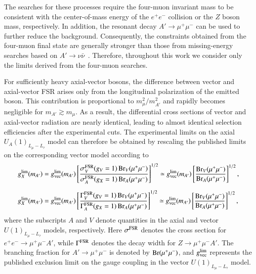 \documentclass[onecolumn, aps, nofootinbib, prd, preprint, floats, floatfix, amsmath, amssymb, superscriptaddress, preprintnumbers]{revtex4-2}
\begin{document}
The searches for these processes require the four-muon invariant mass to be consistent with the center-of-mass energy of the $e^+e^-$ collision or the $Z$ boson mass, respectively. In addition, the resonant decay $A'\to\mu^+\mu^-$ can be used to further reduce the background. Consequently, the constraints obtained from the four-muon final state are generally stronger than those from missing-energy searches based on $A'\rightarrow\nu\bar{\nu}$~\cite{Belle-II:2022yaw}. Therefore, throughout this work we consider only the limits derived from the four-muon searches.

For sufficiently heavy axial-vector bosons, the difference between vector and axial-vector FSR arises only from the longitudinal polarization of the emitted boson. This contribution is proportional to $m_\mu^2/m_{A'}^2$ and rapidly becomes negligible for $m_{A'}\gtrsim m_\mu$. As a result, the differential cross sections of vector and axial-vector radiation are nearly identical, leading to almost identical selection efficiencies after the experimental cuts. The experimental limits on the axial $U_A(1)_{L_\mu-L_\tau}$ model can therefore be obtained by rescaling the published limits on the corresponding vector model according to
\begin{equation}
	\begin{aligned}
		g_X^{\rm lim}(m_{A'})
		&=
		g_{\rm vec}^{\rm lim}(m_{A'})
		\left[
		\frac{\sigma_V^{\rm FSR}(g_V=1)\,
			{\rm Br}_V(\mu^+\mu^-)}
		{\sigma_A^{\rm FSR}(g_X=1)\,
			{\rm Br}_A(\mu^+\mu^-)}
		\right]^{1/2}
		\simeq
		g_{\rm vec}^{\rm lim}(m_{A'})
		\left[
		\frac{{\rm Br}_V(\mu^+\mu^-)}
		{{\rm Br}_A(\mu^+\mu^-)}
		\right]^{1/2},
		\\[2mm]
		g_X^{\rm lim}(m_{A'})
		&=
		g_{\rm vec}^{\rm lim}(m_{A'})
		\left[
		\frac{\Gamma_V^{\rm FSR}(g_V=1)\,
			{\rm Br}_V(\mu^+\mu^-)}
		{\Gamma_A^{\rm FSR}(g_X=1)\,
			{\rm Br}_A(\mu^+\mu^-)}
		\right]^{1/2}
		\simeq
		g_{\rm vec}^{\rm lim}(m_{A'})
		\left[
		\frac{{\rm Br}_V(\mu^+\mu^-)}
		{{\rm Br}_A(\mu^+\mu^-)}
		\right]^{1/2},
	\end{aligned}
	\label{eq:four-muon-rescale}
\end{equation}
where the subscripts $A$ and $V$ denote quantities in the axial and vector $U(1)_{L_\mu-L_\tau}$ models, respectively. Here $\sigma^{\rm FSR}$ denotes the cross section for $e^+e^-\rightarrow\mu^+\mu^-A'$, while $\Gamma^{\rm FSR}$ denotes the decay width for $Z\rightarrow\mu^+\mu^-A'$. The branching fraction for $A'\rightarrow\mu^+\mu^-$ is denoted by ${\rm Br}(\mu^+\mu^-)$, and $g_{\rm vec}^{\rm lim}$ represents the published exclusion limit on the gauge coupling in the vector $U(1)_{L_\mu-L_\tau}$ model.
\end{document}
